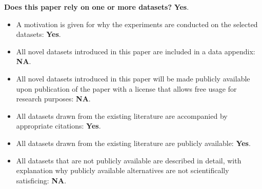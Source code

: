 ﻿\documentclass[letterpaper]{article}
\begin{document}
\noindent\textbf{Does this paper rely on one or more datasets?} \textbf{Yes}.
\begin{itemize}
\item A motivation is given for why the experiments are conducted on the selected datasets: \textbf{Yes}.
\item All novel datasets introduced in this paper are included in a data appendix: \textbf{NA}.
\item All novel datasets introduced in this paper will be made publicly available upon publication of the paper with a license that allows free usage for research purposes: \textbf{NA}.
\item All datasets drawn from the existing literature are accompanied by appropriate citations: \textbf{Yes}.
\item All datasets drawn from the existing literature are publicly available: \textbf{Yes}.
\item All datasets that are not publicly available are described in detail, with explanation why publicly available alternatives are not scientifically satisficing: \textbf{NA}.
\end{itemize}
\end{document}
